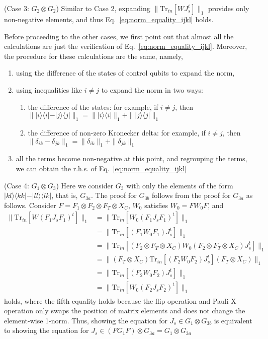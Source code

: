 \documentclass[a4paper,twocolumn,accepted=2022-10-23]{quantumarticle}
\newcommand{\proj}[1]{\vert {#1} \rangle\!\langle {#1} \vert}
\newcommand{\ketbra}[2]{\vert {#1} \rangle\!\langle {#2} \vert}
\newcommand{\Tr}[0]{{\mathrm{Tr}}}
\theoremstyle{definition}
\begin{document}
(Case 3: $G_2 \otimes G_2$) \quad
Similar to Case 2, expanding $\| \Tr_{in} [W J_{s}^t] \|_1$ provides only non-negative elements, and thus Eq.~\eqref{eq:norm_equality_ijkl} holds.



Before proceeding to the other cases,
we first point out that almost all the calculations are just the verification of Eq.~\eqref{eq:norm_equality_ijkl}.
Moreover, the procedure for these calculations are the same, namely,
\begin{enumerate}
\item using the difference of the states of control qubits to expand the norm,
\item using inequalities like $i \neq j$ to expand the norm in two ways:
\begin{enumerate}
\item the difference of the states: for example, if $i \neq j$, then $\| \proj{i} - \proj{j} \|_1 = \| \proj{i} \|_1 + \| \proj{j} \|_1$
\item the difference of non-zero Kronecker delta: for example, if $i \neq j$, then $\| \delta_{ik} - \delta_{jk} \|_1 = \| \delta_{ik} \|_1 + \| \delta_{jk} \|_1 $
\end{enumerate}
\item all the terms become non-negative at this point, and regrouping the terms, we can obtain the r.h.s. of Eq.~\eqref{eq:norm_equality_ijkl}
\end{enumerate}




(Case 4: $G_1 \otimes G_3$) \quad
Here we consider $ G_3 $ with only the elements of the form $ \ketbra{kl}{kk} - \ketbra{ll}{lk} $, that is, $G_{3a}$.
The proof for $G_{3b}$ follows from the proof for $G_{3a}$ as follows.
Consider $F = F_1 \otimes F_2 \otimes F_T \otimes X_C$, $W_0$ satisfies $W_0 = F W_0 F$, and
\begin{align}
\| \Tr_{in} [W (F_1 J_s F_1)^t] \|_1
&= \| \Tr_{in} [W_0 (F_1 J_s F_1)^t] \|_1 \\
&= \| \Tr_{in} [(F_1 W_0 F_1) J_s^t] \|_1 \\
&= \| \Tr_{in} [(F_2 \otimes F_T \otimes X_C) W_0 (F_2 \otimes F_T \otimes X_C) J_s^t] \|_1 \\
&= \| (F_T \otimes X_C) \Tr_{in} [(F_2 W_0 F_2) J_s^t ] (F_T \otimes X_C)\|_1 \\
&= \| \Tr_{in} [(F_2 W_0 F_2) J_s^t ] \|_1 \\
&= \| \Tr_{in} [W_0 (F_2 J_s F_2)^t] \|_1
\end{align}
holds,
where the fifth equality holds because the flip operation and Pauli X operation only swaps the position of matrix elements and does not change the element-wise 1-norm.
Thus, showing the equation for $J_s \in G_1 \otimes G_{3b}$ is equivalent to showing the equation for $J_s \in (F G_1 F) \otimes G_{3a} = G_1 \otimes G_{3a}$
\end{document}
